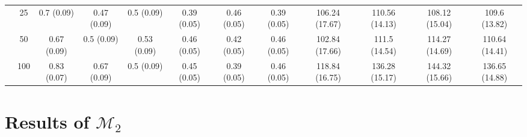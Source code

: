 \documentclass[10pt]{article}
\def\mc#1{\mathcal{#1}} %
\theoremstyle{definition}
\begin{document}
\begin{table}[H]
\begin{center}
{\begin{tabular}{cc|ccc|ccc|cccc|}
    & 25  & 0.7 (0.09) & 0.47 (0.09) & 0.5 (0.09) & 0.39 (0.05) & 0.46 (0.05) & 0.39 (0.05) & 106.24 (17.67) & 110.56 (14.13) & 108.12 (15.04) & 109.6 (13.82) \\ 
    & 50  & 0.67 (0.09) & 0.5 (0.09) & 0.53 (0.09) & 0.46 (0.05) & 0.42 (0.05) & 0.46 (0.05) & 102.84 (17.66) & 111.5 (14.54) & 114.27 (14.69) & 110.64 (14.41) \\ 
    & 100  & 0.83 (0.07) & 0.67 (0.09) & 0.5 (0.09) & 0.45 (0.05) & 0.39 (0.05) & 0.46 (0.05) & 118.84 (16.75) & 136.28 (15.17) & 144.32 (15.66) & 136.65 (14.88) \\ 
\end{tabular}}
   \end{center}
      \vspace{-.5cm}
\end{table}

\section{Results of $\mc{M}_2$}







\end{document}

